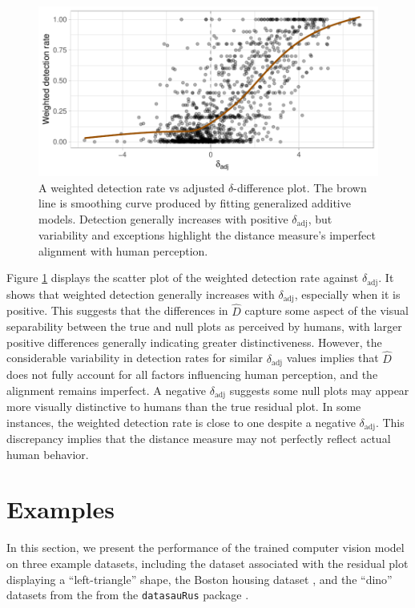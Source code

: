 \documentclass[]{interact}
\theoremstyle{plain}%
\theoremstyle{definition}
\theoremstyle{remark}
\begin{document}
\begin{figure}[!h]

{\centering \includegraphics[width=0.8\linewidth]{paper_files/figure-latex/delta-1} 

}

\caption{A weighted detection rate vs adjusted $\delta$-difference plot. The brown line is smoothing curve produced by fitting generalized additive models. Detection generally increases with positive $\delta_{\text{adj}}$, but variability and exceptions highlight the distance measure's imperfect alignment with human perception.}\label{fig:delta}
\end{figure}

Figure \ref{fig:delta} displays the scatter plot of the weighted
detection rate against \(\delta_{\text{adj}}\). It shows that weighted
detection generally increases with \(\delta_{\text{adj}}\), especially
when it is positive. This suggests that the differences in \(\hat{D}\)
capture some aspect of the visual separability between the true and null
plots as perceived by humans, with larger positive differences generally
indicating greater distinctiveness. However, the considerable
variability in detection rates for similar \(\delta_{\text{adj}}\)
values implies that \(\hat{D}\) does not fully account for all factors
influencing human perception, and the alignment remains imperfect. A
negative \(\delta_{\text{adj}}\) suggests some null plots may appear
more visually distinctive to humans than the true residual plot. In some
instances, the weighted detection rate is close to one despite a
negative \(\delta_{\text{adj}}\). This discrepancy implies that the
distance measure may not perfectly reflect actual human behavior.

\section{Examples}\label{sec-examples}

In this section, we present the performance of the trained computer
vision model on three example datasets, including the dataset associated
with the residual plot displaying a ``left-triangle'' shape, the Boston
housing dataset \citep{harrison1978hedonic}, and the ``dino'' datasets
from the from the \texttt{datasauRus} package \citep{datasaurus}.
\end{document}
